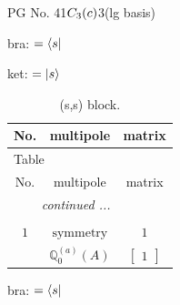 \documentclass[fleqn,8pt,landscape]{jsarticle}
\begin{document}
\setcounter{MaxMatrixCols}{32}

\renewcommand{\tablename}{Table~}
\renewcommand{\figurename}{Figure~}
\begin{center}
\LARGE
PG No. 41\quad$C_{\rm 3}(c)$\quad$3$\quad[ trigonal ] (lg basis)
\end{center}
bra: $=\bra{s}$

\noindent
ket: $=\ket{s}$
\renewcommand{\arraystretch}{1.6}
\begin{longtable}{ccc}
\caption{(s,s) block.}
 \\
 \hline \hline
No. & multipole & matrix \\ \hline \endfirsthead

\multicolumn{2}{l}{\tablename\ \thetable{}} \\
 \hline \hline
No. & multipole & matrix \\ \hline \endhead

 \hline \hline
\multicolumn{2}{r}{\footnotesize\it continued ...} \\ \endfoot

 \hline \hline
\multicolumn{2}{r}{} \\ \endlastfoot

$ 1 $ & $ \text{symmetry} $ & $ 1 $ \\
$  $ & $ \mathbb{Q}_{0}^{(a)}(A) $ & $ \begin{bmatrix} 1 \end{bmatrix} $ \\ \hline
\end{longtable}
bra: $=\bra{s}$
\end{document}
